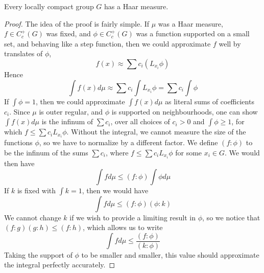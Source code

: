 \begin{theorem}
    Every locally compact group $G$ has a Haar measure.
\end{theorem}
\begin{proof}
    The idea of the proof is fairly simple. If $\mu$ was a Haar measure, $f \in C_c^+(G)$ was fixed, and $\phi \in C_c^+(G)$ was a function supported on a small set, and behaving like a step function, then we could approximate $f$ well by translates of $\phi$,
    \[ f(x) \approx \sum c_i (L_{x_i} \phi) \]
    Hence
    \[ \int f(x) d \mu \approx \sum c_i \int L_{x_i} \phi = \sum c_i \int \phi \]
    If $\int \phi = 1$, then we could approximate $\int f(x) d \mu$ as literal sums of coefficients $c_i$. Since $\mu$ is outer regular, and $\phi$ is supported on neighbourhoods, one can show $\int f(x) d\mu$ is the infinum of $\sum c_i$, over all choices of $c_i > 0$ and $\int \phi \geq 1$, for which $f \leq \sum c_i L_{x_i} \phi$. Without the integral, we cannot measure the size of the functions $\phi$, so we have to normalize by a different factor. We define $(f: \phi)$ to be the infinum of the sums $\sum c_i$, where $f \leq \sum c_i L_{x_i} \phi$ for some $x_i \in G$. We would then have
    \[ \int f d \mu \leq (f: \phi) \int \phi d\mu \]
    If $k$ is fixed with $\int k = 1$, then we would have
    \[ \int f d\mu \leq (f: \phi) (\phi: k) \]
    We cannot change $k$ if we wish to provide a limiting result in $\phi$, so we notice that $(f: g) (g: h) \leq (f:h)$, which allows us to write
    \[ \int f d\mu \leq \frac{(f: \phi)}{(k : \phi)} \]
    Taking the support of $\phi$ to be smaller and smaller, this value should approximate the integral perfectly accurately.


\end{proof}
